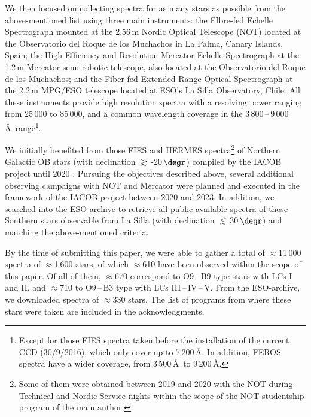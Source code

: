 \documentclass{aa}
\newcommand{\ls}{\mbox{$\lesssim$}}
\newcommand{\gs}{\mbox{$\gtrsim$}}
\begin{document}
We then focused on collecting spectra for as many stars as possible from the above-mentioned list using three main instruments: the FIbre-fed Echelle Spectrograph \citep[FIES,][]{2014AN....335...41T} mounted at the 2.56\,m Nordic Optical Telescope (NOT) located at the Observatorio del Roque de los Muchachos in La Palma, Canary Islands, Spain; the High Efficiency and Resolution Mercator Echelle Spectrograph \citep[HERMES,][]{2011A&A...526A..69R} at the 1.2\,m Mercator semi-robotic telescope, also located at the Observatorio del Roque de los Muchachos; and the Fiber-fed Extended Range Optical Spectrograph \citep[FEROS,][]{1997Msngr..89....1K} at the 2.2\,m MPG/ESO telescope located at ESO's La Silla Observatory, Chile. All these instruments provide high resolution spectra with a resolving power ranging from 25\,000 to 85\,000, and a common wavelength coverage in the 3\,800\,--\,9\,000\,\AA\ range\footnote{Except for those FIES spectra taken before the installation of the current CCD (30/9/2016), which only cover up to 7\,200\,\AA. In addition, FEROS spectra have a wider coverage, from 3\,500\,\AA\ to 9\,200\,\AA.}.

We initially benefited from those FIES and HERMES spectra\footnote{Some of them were obtained between 2019 and 2020 with the NOT during Technical and Nordic Service nights within the scope of the NOT studentship program of the main author.} of Northern Galactic OB stars (with declination \gs\,-20\,$\degr$) compiled by the IACOB project until 2020 \citep[see][for the latest review of the so-called IACOB spectroscopic database]{2020sea..confE.187S}. Pursuing the objectives described above, several additional observing campaigns with NOT and Mercator were planned and executed in the framework of the IACOB project between 2020 and 2023. In addition, we searched into the ESO-archive to retrieve all public available spectra of those Southern stars observable from La Silla (with declination \ls\,30\,$\degr$) and matching the above-mentioned criteria.

By the time of submitting this paper, we were able to gather a total of $\approx$11\,000 spectra of $\approx$1\,600 stars, of which $\approx$610 have been observed within the scope of this paper. Of all of them, $\approx$670 correspond to O9\,--\,B9 type stars with LCs I and II, and $\approx$710 to O9\,--\,B3 type with LCs III\,--\,IV\,--\,V. From the ESO-archive, we downloaded spectra of $\approx$330 stars. The list of programs from where these stars were taken are included in the acknowledgments.
\end{document}

